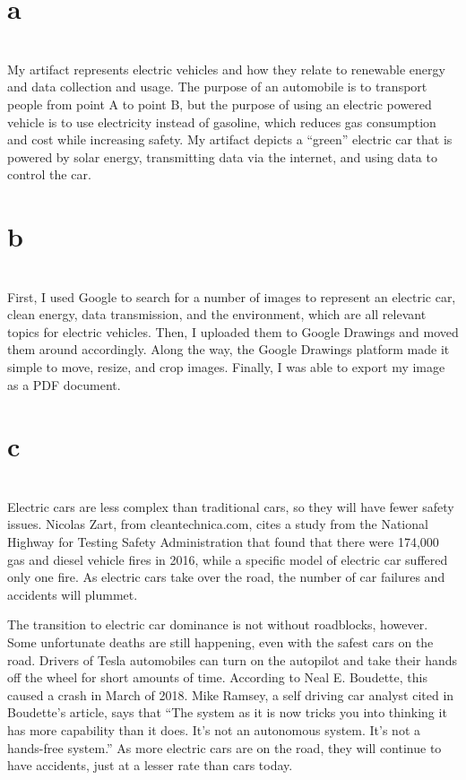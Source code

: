 \documentclass[11pt]{article}
\begin{document}
\selectfont
\section{a}\\
My artifact represents electric vehicles and how they relate to renewable energy and data collection and usage. The purpose of an
automobile is to transport people from point A to point B, but the purpose of using an electric powered vehicle is to use
electricity instead of gasoline, which reduces gas consumption and cost while increasing safety. My artifact depicts a
``green'' electric car that is powered by solar energy, transmitting data via the internet, and using data to control the
car.\double

\section{b}\\
First, I used Google to search for a number of images to represent an electric car, clean energy, data transmission, and the
environment, which are all relevant topics for electric vehicles. Then, I uploaded them to Google Drawings and moved them around
accordingly. Along the way, the Google Drawings platform made it simple to move, resize, and crop images. Finally, I was able to
export my image as a PDF document.\double

\section{c}\\
Electric cars are less complex than traditional cars, so they will have fewer safety issues. Nicolas Zart, from
cleantechnica.com, cites a study from the National Highway for Testing Safety Administration that found that there were 174,000
gas and diesel vehicle fires in 2016, while a specific model of electric car suffered only one fire. As electric cars take over
the road, the number of car failures and accidents will plummet.\double

The transition to electric car dominance is not without roadblocks, however. Some unfortunate deaths are still happening, even
with the safest cars on the road. Drivers of Tesla automobiles can turn on the autopilot and take their hands off the wheel for
short amounts of time. According to Neal E. Boudette, this caused a crash in March of 2018. Mike Ramsey, a self driving car
analyst cited in Boudette's article, says that ``The system as it is now tricks you into thinking it has more capability than it
does. It's not an autonomous system. It's not a hands-free system.'' As more electric cars are on the road, they will continue to
have accidents, just at a lesser rate than cars today.\double
\end{document}
